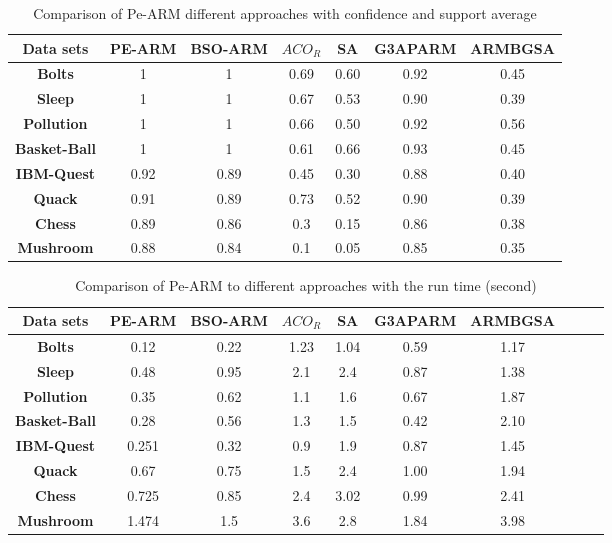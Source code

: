 \documentclass[preprint,12pt]{elsarticle}
\begin{document}
\begin{table}[htbp]
\small
\centering
\label{Fig3}
\caption{Comparison of Pe-ARM different approaches with confidence and support average }
\begin{tabular}{c c c c c c c}
\toprule
\textbf{Data sets} &  PE-ARM& BSO-ARM & $ACO_{R}$ & SA & G3APARM & ARMBGSA\\
\midrule
\textbf{Bolts}&		1&		1& 0.69 & 0.60 & 0.92 & 0.45\\\hline
\textbf{Sleep}&		1&		1& 0.67 & 0.53 & 0.90 & 0.39\\\hline
\textbf{Pollution}&		1&		1 & 0.66 & 0.50 & 0.92 & 0.56\\\hline
\textbf{Basket-Ball}&	 1&		1 & 0.61 & 0.66 & 0.93 & 0.45\\\hline
\textbf{IBM-Quest}&	 0.92&	0.89 &  0.45 & 0.30 & 0.88 & 0.40\\\hline
\textbf{Quack}&		0.91&		0.89& 0.73 & 0.52 & 0.90 & 0.39\\\hline
\textbf{Chess}&		0.89&		0.86 & 0.3 & 0.15 & 0.86 & 0.38\\\hline
\textbf{Mushroom}&	0.88 &	0.84 & 0.1 & 0.05 & 0.85 &0.35\\\hline
\bottomrule
\end{tabular}
\end{table}
\begin{table}[htbp]
\small
\centering
\label{Fig4}
\caption{Comparison of Pe-ARM to different approaches with the run time (second)}
\begin{tabular}{c c c c c c c c c c}
\toprule
\textbf{Data sets} & PE-ARM& BSO-ARM & $ACO_{R}$ & SA & G3APARM & ARMBGSA \\
\midrule
\textbf{Bolts}&			0.12&		0.22& 1.23 & 1.04 & 0.59 & 1.17 &\\\hline
\textbf{Sleep}&		0.48&		0.95& 2.1 & 2.4 & 0.87 & 1.38 &\\\hline
\textbf{Pollution}&		0.35&		0.62& 1.1 & 1.6 & 0.67 & 1.87 &\\\hline
\textbf{Basket-Ball}&		0.28&		0.56&  1.3 & 1.5 & 0.42 & 2.10 &\\\hline
\textbf{IBM-Quest}&		0.251&	0.32& 0.9 & 1.9 & 0.87 & 1.45 &\\\hline
\textbf{Quack}&		0.67&		0.75&  1.5 & 2.4 & 1.00 & 1.94 &\\\hline
\textbf{Chess}&		0.725&		0.85& 2.4 &  3.02 & 0.99& 2.41 &\\\hline
\textbf{Mushroom}&		1.474&	1.5& 3.6 & 2.8 & 1.84 & 3.98 &\\\hline
\bottomrule
\end{tabular}
\end{table}
\end{document}
